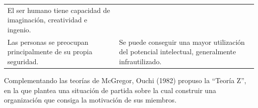 \documentclass[
]{krantz}
\begin{document}
\begin{longtable}[]{@{}ll@{}}
\begin{minipage}[t]{0.47\columnwidth}
El ser humano tiene capacidad de imaginación, creatividad e ingenio.\strut
\end{minipage}\tabularnewline
\begin{minipage}[t]{0.47\columnwidth}\raggedright
Las personas se preocupan principalmente de su propia seguridad.\strut
\end{minipage} & \begin{minipage}[t]{0.47\columnwidth}\raggedright
Se puede conseguir una mayor utilización del potencial intelectual, generalmente infrautilizado.\strut
\end{minipage}\tabularnewline
\bottomrule
\end{longtable}

Complementando las teorías de McGregor, Ouchi (1982) propuso la ``Teoría Z'', en la que plantea una situación de partida sobre la cual construir una organización que consiga la motivación de sus miembros.
\end{document}
